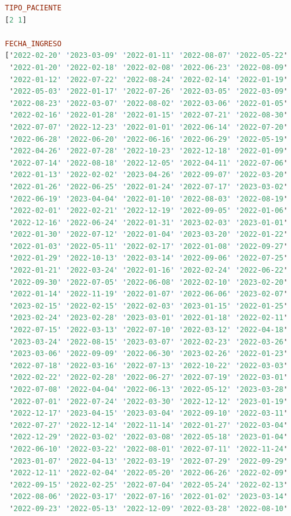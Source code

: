 \begin{lstlisting}[language=haskell, caption=Valores por columna, captionpos=b, label=lst:fiboHaskell]
TIPO_PACIENTE
[2 1]

FECHA_INGRESO
['2022-02-20' '2023-03-09' '2022-01-11' '2022-08-07' '2022-05-22'
 '2022-01-20' '2022-02-18' '2022-02-08' '2022-06-23' '2022-08-09'
 '2022-01-12' '2022-07-22' '2022-08-24' '2022-02-14' '2022-01-19'
 '2022-05-03' '2022-01-17' '2022-07-26' '2022-03-05' '2022-03-09'
 '2022-08-23' '2022-03-07' '2022-08-02' '2022-03-06' '2022-01-05'
 '2022-02-16' '2022-01-28' '2022-01-15' '2022-07-21' '2022-08-30'
 '2022-07-07' '2022-12-23' '2022-01-01' '2022-06-14' '2022-07-20'
 '2022-06-28' '2022-06-20' '2022-06-16' '2022-06-29' '2022-05-19'
 '2022-04-26' '2022-07-28' '2022-10-23' '2022-12-18' '2022-01-09'
 '2022-07-14' '2022-08-18' '2022-12-05' '2022-04-11' '2022-07-06'
 '2022-01-13' '2022-02-02' '2023-04-26' '2022-09-07' '2022-03-20'
 '2022-01-26' '2022-06-25' '2022-01-24' '2022-07-17' '2023-03-02'
 '2022-06-19' '2023-04-04' '2022-01-10' '2022-08-03' '2022-08-19'
 '2022-02-01' '2022-02-21' '2022-12-19' '2022-09-05' '2022-01-06'
 '2022-12-16' '2022-06-24' '2022-01-31' '2023-02-03' '2023-01-01'
 '2022-01-30' '2022-07-12' '2022-01-04' '2023-03-20' '2022-01-22'
 '2022-01-03' '2022-05-11' '2022-02-17' '2022-01-08' '2022-09-27'
 '2022-01-29' '2022-10-13' '2022-03-14' '2022-09-06' '2022-07-25'
 '2022-01-21' '2022-03-24' '2022-01-16' '2022-02-24' '2022-06-22'
 '2022-09-30' '2022-07-05' '2022-06-08' '2022-02-10' '2023-02-20'
 '2022-01-14' '2022-11-19' '2022-01-07' '2022-06-06' '2023-02-07'
 '2023-02-15' '2022-02-15' '2022-02-03' '2023-01-15' '2022-01-25'
 '2023-02-24' '2023-02-28' '2023-03-01' '2022-01-18' '2022-02-11'
 '2022-07-15' '2022-03-13' '2022-07-10' '2022-03-12' '2022-04-18'
 '2023-03-24' '2022-08-15' '2023-03-07' '2022-02-23' '2022-03-26'
 '2023-03-06' '2022-09-09' '2022-06-30' '2023-02-26' '2022-01-23'
 '2022-07-18' '2022-03-16' '2022-07-13' '2022-10-22' '2022-03-03'
 '2022-02-22' '2022-02-28' '2022-06-27' '2022-07-19' '2022-03-01'
 '2022-07-08' '2022-04-04' '2022-06-13' '2022-05-12' '2023-03-28'
 '2022-07-01' '2022-07-24' '2022-03-30' '2022-12-12' '2023-01-19'
 '2022-12-17' '2023-04-15' '2023-03-04' '2022-09-10' '2022-03-11'
 '2022-07-27' '2022-12-14' '2022-11-14' '2022-01-27' '2022-03-04'
 '2022-12-29' '2022-03-02' '2022-03-08' '2022-05-18' '2023-01-04'
 '2022-06-10' '2022-03-22' '2022-08-01' '2022-07-11' '2022-11-24'
 '2023-01-07' '2022-04-13' '2022-03-19' '2022-07-29' '2022-09-29'
 '2022-12-11' '2022-02-04' '2022-05-20' '2022-06-26' '2022-02-09'
 '2022-09-15' '2022-02-25' '2022-07-04' '2022-05-24' '2022-02-13'
 '2022-08-06' '2022-03-17' '2022-07-16' '2022-01-02' '2023-03-14'
 '2022-09-23' '2022-05-13' '2022-12-09' '2022-03-28' '2022-08-10'

\end{lstlisting}
